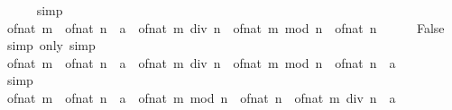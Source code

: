 \begin{isabellebody}
\ \ \ \ \isamarkupfalse%
\ simp\isanewline
\ \ \isamarkupfalse%
\ \isamarkupfalse%
\ {\isachardoublequoteopen}{\isacharparenleft}{\kern0pt}of{\isacharunderscore}{\kern0pt}nat\ m\ {\isacharslash}{\kern0pt}\ of{\isacharunderscore}{\kern0pt}nat\ n\ {\isacharcolon}{\kern0pt}{\isacharcolon}{\kern0pt}\ {\isacharprime}{\kern0pt}a{\isacharparenright}{\kern0pt}\ {\isacharequal}{\kern0pt}\ of{\isacharunderscore}{\kern0pt}nat\ {\isacharparenleft}{\kern0pt}m\ div\ n{\isacharparenright}{\kern0pt}\ {\isacharplus}{\kern0pt}\ of{\isacharunderscore}{\kern0pt}nat\ {\isacharparenleft}{\kern0pt}m\ mod\ n{\isacharparenright}{\kern0pt}\ {\isacharslash}{\kern0pt}\ of{\isacharunderscore}{\kern0pt}nat\ n{\isachardoublequoteclose}\isanewline
\ \ \ \ \isamarkupfalse%
\ False\ \isamarkupfalse%
\ {\isacharparenleft}{\kern0pt}simp\ only{\isacharcolon}{\kern0pt}{\isacharparenright}{\kern0pt}\ simp\isanewline
\ \ \isamarkupfalse%
\ \isamarkupfalse%
\ {\isachardoublequoteopen}{\isasymlfloor}of{\isacharunderscore}{\kern0pt}nat\ m\ {\isacharslash}{\kern0pt}\ of{\isacharunderscore}{\kern0pt}nat\ n\ {\isacharcolon}{\kern0pt}{\isacharcolon}{\kern0pt}\ {\isacharprime}{\kern0pt}a{\isasymrfloor}\ {\isacharequal}{\kern0pt}\ {\isasymlfloor}of{\isacharunderscore}{\kern0pt}nat\ {\isacharparenleft}{\kern0pt}m\ div\ n{\isacharparenright}{\kern0pt}\ {\isacharplus}{\kern0pt}\ of{\isacharunderscore}{\kern0pt}nat\ {\isacharparenleft}{\kern0pt}m\ mod\ n{\isacharparenright}{\kern0pt}\ {\isacharslash}{\kern0pt}\ of{\isacharunderscore}{\kern0pt}nat\ n\ {\isacharcolon}{\kern0pt}{\isacharcolon}{\kern0pt}\ {\isacharprime}{\kern0pt}a{\isasymrfloor}{\isachardoublequoteclose}\isanewline
\ \ \ \ \isamarkupfalse%
\ simp\isanewline
\ \ \isamarkupfalse%
\ \isamarkupfalse%
\ {\isachardoublequoteopen}{\isasymlfloor}of{\isacharunderscore}{\kern0pt}nat\ m\ {\isacharslash}{\kern0pt}\ of{\isacharunderscore}{\kern0pt}nat\ n\ {\isacharcolon}{\kern0pt}{\isacharcolon}{\kern0pt}\ {\isacharprime}{\kern0pt}a{\isasymrfloor}\ {\isacharequal}{\kern0pt}\ {\isasymlfloor}of{\isacharunderscore}{\kern0pt}nat\ {\isacharparenleft}{\kern0pt}m\ mod\ n{\isacharparenright}{\kern0pt}\ {\isacharslash}{\kern0pt}\ of{\isacharunderscore}{\kern0pt}nat\ n\ {\isacharplus}{\kern0pt}\ of{\isacharunderscore}{\kern0pt}nat\ {\isacharparenleft}{\kern0pt}m\ div\ n{\isacharparenright}{\kern0pt}\ {\isacharcolon}{\kern0pt}{\isacharcolon}{\kern0pt}\ {\isacharprime}{\kern0pt}a{\isasymrfloor}{\isachardoublequoteclose}\isanewline

\end{isabellebody}
